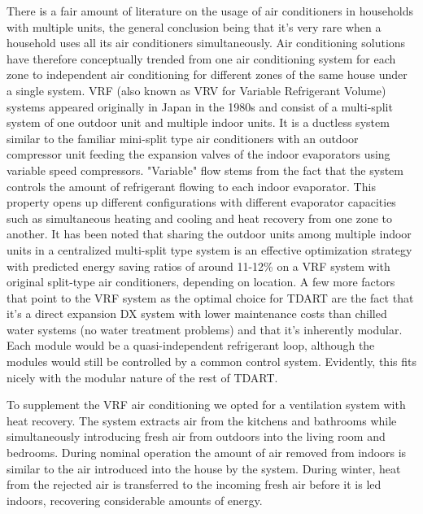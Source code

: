 \documentclass[justified]{tufte-book}
\begin{document}
	There is a fair amount of literature\cite{jian2011study, ran2011wu, li2014testing}  on the usage of air conditioners in households  with multiple units, the general conclusion being that it's very rare when a household uses all its air conditioners simultaneously.
	Air conditioning solutions have therefore conceptually trended from one air conditioning system for each zone to independent air conditioning for different zones of the same house under a single system\cite{park2001performance}. VRF (also known as VRV for Variable Refrigerant Volume) systems appeared originally in Japan in the 1980s and consist of a multi-split system of one outdoor unit and multiple indoor units. It is a ductless system similar to the familiar mini-split type air conditioners with an outdoor compressor unit feeding the expansion valves of the indoor evaporators using variable speed compressors. "Variable" flow stems from the fact that the system controls the amount of refrigerant flowing to each indoor evaporator. This property opens up different configurations with different evaporator capacities such as simultaneous heating and cooling and heat recovery from one zone to another\cite{goetzler2007variable}.
	It has been noted that sharing the outdoor units among multiple indoor units in a centralized multi-split type system is an effective optimization strategy\cite{li2017simulation} with predicted energy saving ratios of around 11-12\% on a VRF system with original split-type air conditioners, depending on location. A few more factors that point to the VRF system as the optimal choice for TDART are the fact that it's a direct expansion DX system with lower maintenance costs than chilled water systems (no water treatment problems) and that it's inherently modular. Each module would be a quasi-independent refrigerant loop, although the modules would still be controlled by a common control system. Evidently, this fits nicely with the modular nature of the rest of TDART.
\par To supplement the VRF air conditioning we opted for a ventilation system with heat recovery. The system extracts air from the kitchens and bathrooms while simultaneously introducing fresh air from outdoors into the living room and bedrooms. During nominal operation the amount of air removed from indoors is similar to the air introduced into the house by the system. During winter, heat from the rejected air is transferred to the incoming fresh air before it is led indoors, recovering considerable amounts of energy.
\par    
\end{document}

